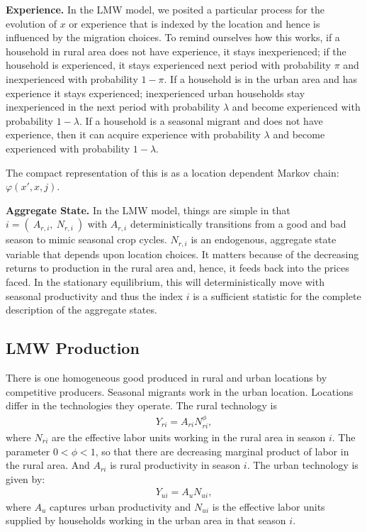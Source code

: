 \documentclass[12pt,pdftex]{article}
\begin{document}
\begin{onehalfspacing}
\textbf{Experience.} In the LMW model, we posited a particular process for the evolution of $x$ or experience that is indexed by the location and hence is influenced by the migration choices. To remind ourselves how this works, if a household in rural area does not have experience, it stays inexperienced; if the household is experienced, it stays experienced next period with probability $\pi$ and inexperienced with probability $1-\pi$.  If a household is in the urban area and has experience it stays experienced; inexperienced urban households stay inexperienced in the next period with probability $\lambda$ and become experienced with probability $1-\lambda$. If a household is a seasonal migrant and does not have experience, then it can acquire experience with probability $\lambda$ and become experienced with probability $1-\lambda$.

The compact representation of this is as a location dependent Markov chain: $\varphi(x',x, j)$.

\textbf{Aggregate State.} In the LMW model, things are simple in that $i = ( \ A_{r,i}, \ N_{r,i} \ )$ with $A_{r,i}$ deterministically transitions from a good and bad season to mimic seasonal crop cycles. $N_{r,i}$ is an endogenous, aggregate state variable that depends upon location choices. It matters because of the decreasing returns to production in the rural area and, hence, it feeds back into the prices faced. In the stationary equilibrium, this will deterministically move with seasonal productivity and thus the index $i$ is a sufficient statistic for the complete description of the aggregate states. 

\subsection{LMW Production}

There is one homogeneous good produced in rural and urban locations by competitive producers. Seasonal migrants work in the urban location. Locations differ in the technologies they operate. The rural technology is
\begin{align}
Y_{ri} = A_{ri} N_{ri}^\phi,
\end{align}
where $N_{ri}$ are the effective labor units working in the rural area in season $i$. The parameter $0<\phi <1$, so that there are decreasing marginal product of labor in the rural area. And $A_{ri}$ is rural productivity in season $i$. The urban technology is given by:
\begin{align}
Y_{ui} = A_u N_{ui},
\end{align}
where $A_u$ captures urban productivity and $N_{ui}$ is the effective labor units supplied by households working in the urban area in that season $i$.


\end{onehalfspacing}
\end{document}

